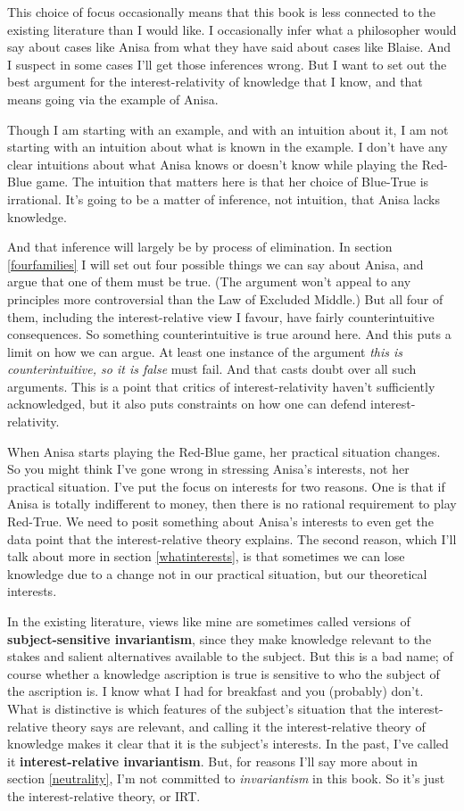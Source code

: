 \documentclass[
  11pt,
]{book}
\begin{document}
This choice of focus occasionally means that this book is less connected to the existing literature than I would like. I occasionally infer what a philosopher would say about cases like Anisa from what they have said about cases like Blaise. And I suspect in some cases I'll get those inferences wrong. But I want to set out the best argument for the interest-relativity of knowledge that I know, and that means going via the example of Anisa.

Though I am starting with an example, and with an intuition about it, I am not starting with an intuition about what is known in the example. I don't have any clear intuitions about what Anisa knows or doesn't know while playing the Red-Blue game. The intuition that matters here is that her choice of Blue-True is irrational. It's going to be a matter of inference, not intuition, that Anisa lacks knowledge.

And that inference will largely be by process of elimination. In section \ref{fourfamilies} I will set out four possible things we can say about Anisa, and argue that one of them must be true. (The argument won't appeal to any principles more controversial than the Law of Excluded Middle.) But all four of them, including the interest-relative view I favour, have fairly counterintuitive consequences. So something counterintuitive is true around here. And this puts a limit on how we can argue. At least one instance of the argument \emph{this is counterintuitive, so it is false} must fail. And that casts doubt over all such arguments. This is a point that critics of interest-relativity haven't sufficiently acknowledged, but it also puts constraints on how one can defend interest-relativity.

When Anisa starts playing the Red-Blue game, her practical situation changes. So you might think I've gone wrong in stressing Anisa's interests, not her practical situation. I've put the focus on interests for two reasons. One is that if Anisa is totally indifferent to money, then there is no rational requirement to play Red-True. We need to posit something about Anisa's interests to even get the data point that the interest-relative theory explains. The second reason, which I'll talk about more in section \ref{whatinterests}, is that sometimes we can lose knowledge due to a change not in our practical situation, but our theoretical interests.

In the existing literature, views like mine are sometimes called versions of \textbf{subject-sensitive invariantism}, since they make knowledge relevant to the stakes and salient alternatives available to the subject. But this is a bad name; of course whether a knowledge ascription is true is sensitive to who the subject of the ascription is. I know what I had for breakfast and you (probably) don't. What is distinctive is which features of the subject's situation that the interest-relative theory says are relevant, and calling it the interest-relative theory of knowledge makes it clear that it is the subject's interests. In the past, I've called it \textbf{interest-relative invariantism}. But, for reasons I'll say more about in section \ref{neutrality}, I'm not committed to \emph{invariantism} in this book. So it's just the interest-relative theory, or IRT.
\end{document}
